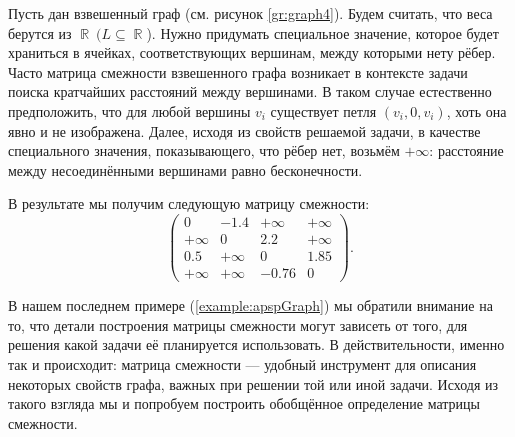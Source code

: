 \begin{marginfigure}
    \begin{center}
        \resizebox{\marginparwidth}{!}{}
    \end{center}
    \caption{Взвешенный граф}
    \label{gr:graph4}
\end{marginfigure}
\begin{example}
    \label{example:apspGraph}
    Пусть дан взвешенный граф (см. рисунок \ref{gr:graph4}).
    Будем считать, что веса берутся из $\BbbR \ (L \subseteq \BbbR$).
    Нужно придумать специальное значение, которое будет храниться в ячейках, соответствующих вершинам, между которыми нету рёбер.
    Часто матрица смежности взвешенного графа возникает в контексте задачи поиска кратчайших расстояний между вершинами.
    В таком случае естественно предположить, что для любой вершины $v_i$ существует петля $(v_i, 0, v_i)$, хоть она явно и не изображена.
    Далее, исходя из свойств решаемой задачи, в качестве специального значения, показывающего, что рёбер нет, возьмём $+\infty$: расстояние между несоединёнными вершинами равно бесконечности.

    В результате мы получим следующую матрицу смежности:
    \[
        \begin{pmatrix}
            0       & -1.4    & +\infty & +\infty \\
            +\infty & 0       & 2.2     & +\infty \\
            0.5     & +\infty & 0       & 1.85    \\
            +\infty & +\infty & -0.76   & 0
        \end{pmatrix}.
    \]
\end{example}

В нашем последнем примере (\ref{example:apspGraph}) мы обратили внимание на то, что детали построения матрицы смежности могут зависеть от того, для решения какой задачи её планируется использовать.
В действительности, именно так и происходит: матрица смежности --- удобный инструмент для описания некоторых свойств графа, важных при решении той или иной задачи.
Исходя из такого взгляда мы и попробуем построить обобщённое определение матрицы смежности.

